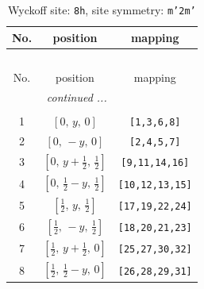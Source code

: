 \documentclass[fleqn,8pt]{jsarticle}
\begin{document}
\begin{longtable}{ccc}
\caption{Wyckoff site: {\tt 8h}, site symmetry: {\tt m'2m'}}
 \\
 \hline \hline
No. & position & mapping \\ \hline \endfirsthead

\multicolumn{2}{l}{\tablename\ \thetable{}} \\
 \hline \hline
No. & position & mapping \\ \hline \endhead

 \hline \hline
\multicolumn{2}{r}{\footnotesize\it continued ...} \\ \endfoot

 \hline \hline
\multicolumn{2}{r}{} \\ \endlastfoot

1 & $\left[ 0,\, y,\, 0 \right]$ & {\tt [1,3,6,8]} \\ \hline
2 & $\left[ 0,\, - y,\, 0 \right]$ & {\tt [2,4,5,7]} \\ \hline
3 & $\left[ 0,\, y + \frac{1}{2},\, \frac{1}{2} \right]$ & {\tt [9,11,14,16]} \\ \hline
4 & $\left[ 0,\, \frac{1}{2} - y,\, \frac{1}{2} \right]$ & {\tt [10,12,13,15]} \\ \hline
5 & $\left[ \frac{1}{2},\, y,\, \frac{1}{2} \right]$ & {\tt [17,19,22,24]} \\ \hline
6 & $\left[ \frac{1}{2},\, - y,\, \frac{1}{2} \right]$ & {\tt [18,20,21,23]} \\ \hline
7 & $\left[ \frac{1}{2},\, y + \frac{1}{2},\, 0 \right]$ & {\tt [25,27,30,32]} \\ \hline
8 & $\left[ \frac{1}{2},\, \frac{1}{2} - y,\, 0 \right]$ & {\tt [26,28,29,31]} \\
\end{longtable}
\renewcommand{\arraystretch}{1.2}
\end{document}
